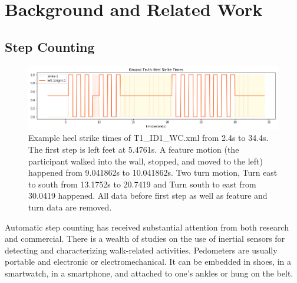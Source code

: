 \documentclass[11pt]{article}
\begin{document}
{\section{Background and Related Work}

\subsection{Step Counting}

\begin{figure}[ht]
\centering
\includegraphics[scale=0.5]{ground_truth_2}
\caption{Example heel strike times of T1\_ID1\_WC.xml from 2.4s to 34.4s. The first step is left feet at 5.4761s. A feature motion (the participant walked into the wall, stopped, and moved to the left) happened from 9.041862s to 10.041862s. Two turn motion, Turn east to south from 13.1752s to 20.7419 and Turn south to east from 30.0419 happened. All data before first step as well as feature and turn data are removed.}
\label{fig:ground_truth}
\end{figure}


Automatic step counting has received substantial attention from both research and commercial. There is a wealth of studies on the use of inertial sensors for detecting and characterizing walk-related activities. Pedometers are usually portable and electronic or electromechanical. It can be embedded in shoes, in a smartwatch, in a smartphone, and attached to one’s ankles or hung on the belt.


}
\end{document}
